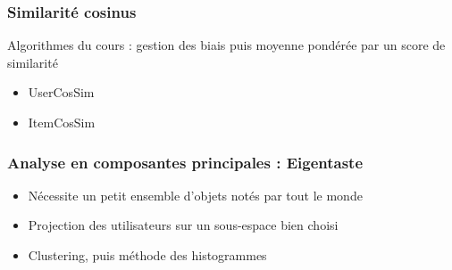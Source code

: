 \documentclass[18pt]{beamer}
\begin{document}
	\begin{frame}
		\frametitle{Similarité cosinus}
		
		Algorithmes du cours : gestion des biais puis moyenne pondérée par un score de similarité
		\begin{itemize}
			\item UserCosSim
			\item ItemCosSim
		\end{itemize} 
	\end{frame}
	\begin{frame}
		\frametitle{Analyse en composantes principales : Eigentaste}
		
		\begin{itemize}
			\item Nécessite un petit ensemble d'objets notés par tout le monde
			\item Projection des utilisateurs sur un sous-espace bien choisi
			\item Clustering, puis méthode des histogrammes
		\end{itemize}
	\end{frame}
	
\end{document}
